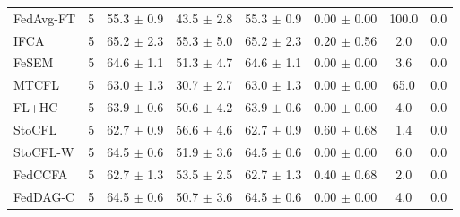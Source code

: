 {\begin{tabular}{l r c c c c c c}
FedAvg-FT & 5 & 55.3 $\pm$ 0.9 & 43.5 $\pm$ 2.8 & 55.3 $\pm$ 0.9 & 0.00 $\pm$ 0.00 & 100.0 & 0.0 \\
IFCA & 5 & 65.2 $\pm$ 2.3 & 55.3 $\pm$ 5.0 & 65.2 $\pm$ 2.3 & 0.20 $\pm$ 0.56 & 2.0 & 0.0 \\
FeSEM & 5 & 64.6 $\pm$ 1.1 & 51.3 $\pm$ 4.7 & 64.6 $\pm$ 1.1 & 0.00 $\pm$ 0.00 & 3.6 & 0.0 \\
MTCFL & 5 & 63.0 $\pm$ 1.3 & 30.7 $\pm$ 2.7 & 63.0 $\pm$ 1.3 & 0.00 $\pm$ 0.00 & 65.0 & 0.0 \\
FL+HC & 5 & 63.9 $\pm$ 0.6 & 50.6 $\pm$ 4.2 & 63.9 $\pm$ 0.6 & 0.00 $\pm$ 0.00 & 4.0 & 0.0 \\
StoCFL & 5 & 62.7 $\pm$ 0.9 & 56.6 $\pm$ 4.6 & 62.7 $\pm$ 0.9 & 0.60 $\pm$ 0.68 & 1.4 & 0.0 \\
StoCFL-W & 5 & 64.5 $\pm$ 0.6 & 51.9 $\pm$ 3.6 & 64.5 $\pm$ 0.6 & 0.00 $\pm$ 0.00 & 6.0 & 0.0 \\
FedCCFA & 5 & 62.7 $\pm$ 1.3 & 53.5 $\pm$ 2.5 & 62.7 $\pm$ 1.3 & 0.40 $\pm$ 0.68 & 2.0 & 0.0 \\
FedDAG-C & 5 & 64.5 $\pm$ 0.6 & 50.7 $\pm$ 3.6 & 64.5 $\pm$ 0.6 & 0.00 $\pm$ 0.00 & 4.0 & 0.0 \\
\bottomrule
\end{tabular}
}

